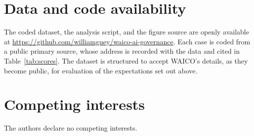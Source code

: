 \documentclass[11pt]{article}
\begin{document}
\section*{Data and code availability}
The coded dataset, the analysis script, and the figure source are openly available at \url{https://github.com/williamguey/waico-ai-governance}. Each case is coded from a public primary source, whose address is recorded with the data and cited in Table~\ref{tab:scores}. The dataset is structured to accept WAICO's details, as they become public, for evaluation of the expectations set out above.

\section*{Competing interests}
The authors declare no competing interests.


\end{document}
